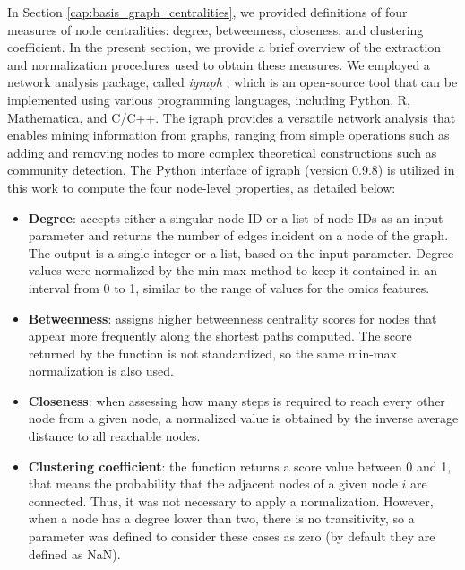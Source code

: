 In Section \ref{cap:basis_graph_centralities}, we provided definitions of four measures of node centralities: degree, betweenness, closeness, and clustering coefficient. In the present section, we provide a brief overview of the extraction and normalization procedures used to obtain these measures. We employed a network analysis package, called \textit{igraph} \cite{igraphpackage}, which is an open-source tool that can be implemented using various programming languages, including Python, R, Mathematica, and C/C++. The igraph provides a versatile network analysis that enables mining information from graphs, ranging from simple operations such as adding and removing nodes to more complex theoretical constructions such as community detection. The Python interface of igraph (version 0.9.8) is utilized in this work to compute the four node-level properties, as detailed below:
\begin{itemize}
   
    \item \textbf{Degree}: accepts either a singular node ID or a list of node IDs as an input parameter and returns the number of edges incident on a node of the graph. The output is a single integer or a list, based on the input parameter. Degree values were normalized by the min-max method to keep it contained in an interval from 0 to 1, similar to the range of values for the omics features.

    \item \textbf{Betweenness}: assigns higher betweenness centrality scores for nodes that appear more frequently along the shortest paths computed. The score returned by the function is not standardized, so the same min-max normalization is also used.

    \item \textbf{Closeness}: when assessing how many steps is required to reach every other node from a given node, a normalized value is obtained by the inverse average distance to all reachable nodes.

    \item \textbf{Clustering coefficient}: the function returns a score value between 0 and 1, that means the probability that the adjacent nodes of a given node $i$ are connected. Thus, it was not necessary to apply a normalization. However, when a node has a degree lower than two, there is no transitivity, so a parameter was defined to consider these cases as zero (by default they are defined as NaN).
\end{itemize}

